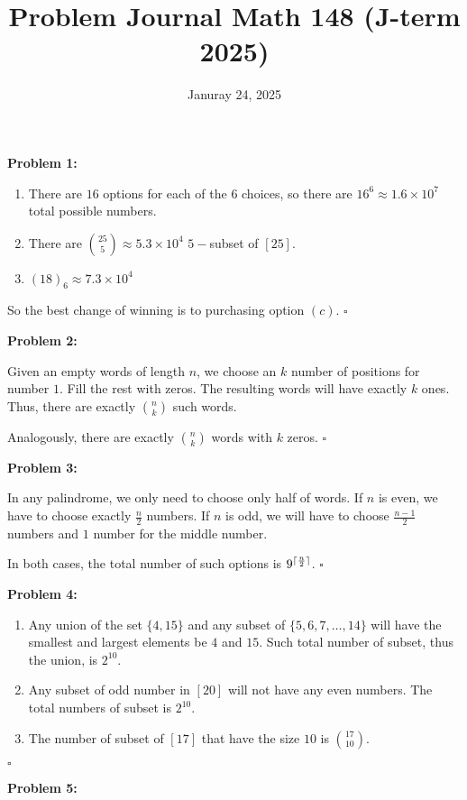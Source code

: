 \documentclass[12pt]{article}
\title{Problem Journal Math 148 (J-term 2025)} %
\date{Januray 24, 2025}
\DeclarePairedDelimiter{\ceil}{\lceil}{\rceil}
\begin{document}
\maketitle

\textbf{Problem 1:}

\begin{enumerate}[label=(\alph*)]
    \item There are $16$ options for each of the $6$ choices, so there are $16^6 \approx 1.6\times 10^7$ total possible numbers.
    \item There are $\binom{25}{5} \approx 5.3 \times 10^4$ $5-$subset of $[25]$.
    \item $(18)_6 \approx 7.3 \times 10^4$
\end{enumerate}

So the best change of winning is to purchasing option $(c)$.
$\square$

\textbf{Problem 2:}

Given an empty words of length $n$, we choose an $k$ number of positions for number $1$. Fill the rest with zeros. The resulting words will have exactly $k$ ones.
Thus, there are exactly $\binom{n}{k}$ such words.

Analogously, there are exactly $\binom{n}{k}$ words with $k$ zeros. $\square$

\textbf{Problem 3:}

In any palindrome, we only need to choose only half of words. If $n$ is even, we have to choose exactly $\frac{n}{2}$ numbers. If $n$ is odd, we will have to choose $\frac{n-1}{2}$ numbers and $1$ number for the middle number.

In both cases, the total number of such options is $9^{\ceil{\frac{n}{2}}}$. $\square$

\textbf{Problem 4:}

\begin{enumerate}[label=(\alph*)]
    \item Any union of the set $\{4,15\}$ and any subset of $\{5, 6, 7, \dots,  14\}$ will have the smallest and largest elements be $4$ and $15$. Such total number of subset, thus the union, is $2^{10}$.
    \item Any subset of odd number in $[20]$ will not have any even numbers. The total numbers of subset is $2^{10}$.
    \item The number of subset of $[17]$ that have the size $10$ is $\binom{17}{10}$.
\end{enumerate} $\square$

\textbf{Problem 5:}
\end{document}

